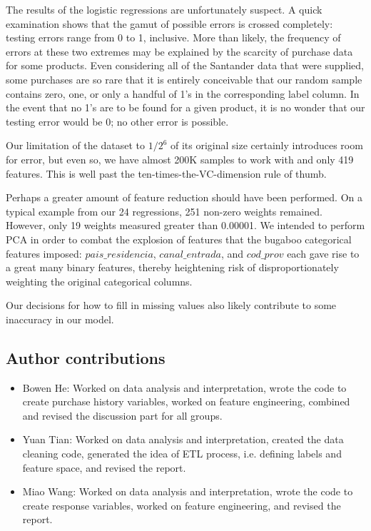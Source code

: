 \documentclass{article}
\begin{document}
\begin{spacing}{1}
\begin{large}
The results of the logistic regressions are unfortunately suspect. A quick examination shows that the gamut of possible errors is crossed completely: testing errors range from 0 to 1, inclusive. More than likely, the frequency of errors at these two extremes may be explained by the scarcity of purchase data for some products. Even considering all of the Santander data that were supplied, some purchases are so rare that it is entirely conceivable that our random sample contains zero, one, or only a handful of 1's in the corresponding label column. In the event that no 1's are to be found for a given product, it is no wonder that our testing error would be 0; no other error is possible.

Our limitation of the dataset to $1/2^6$ of its original size certainly introduces room for error, but even so, we have almost 200K samples to work with and only 419 features. This is well past the ten-times-the-VC-dimension rule of thumb.\cite{amlbook} 

Perhaps a greater amount of feature reduction should have been performed. On a typical example from our 24 regressions, 251 non-zero weights remained. However, only 19 weights measured greater than 0.00001. We intended to perform PCA in order to combat the explosion of features that the bugaboo categorical features imposed: $pais\_residencia$, $canal\_entrada$, and $cod\_prov$ each gave rise to a great many binary features, thereby heightening risk of disproportionately weighting the original categorical columns.

Our decisions for how to fill in missing values also likely contribute to some inaccuracy in our model.

\subsection{Author contributions}
\begin{itemize}
	\item Bowen He:  Worked on data analysis and interpretation, wrote the code to create purchase history variables, worked on feature engineering, combined and revised the discussion part for all groups.
	
	\item Yuan Tian:  Worked on data analysis and interpretation, created the data cleaning code, generated the idea of ETL process, i.e. defining labels and feature space, and revised the report.
	
	\item Miao Wang:  Worked on data analysis and interpretation, wrote the code to create response variables, worked on feature engineering, and revised the report.
	

\end{itemize}
\end{large}
\end{spacing}
\end{document}
